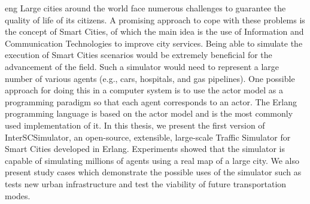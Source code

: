 \begin{resumo}{eng}
Large cities around the world face numerous challenges to guarantee the quality of life of its citizens. A promising approach to cope with these problems is the concept of Smart Cities, of which the main idea is the use of Information and Communication Technologies to improve city services. Being able to simulate the execution of Smart Cities scenarios would be extremely beneficial for the advancement of the field. Such a simulator would need to represent a large number of various agents (e.g., cars, hospitals, and gas pipelines). One possible approach for doing this in a computer system is to use the actor model as a programming paradigm so that each agent corresponds to an actor. The Erlang programming language is based on the actor model and is the most commonly used implementation of it. In this thesis, we present the first version of InterSCSimulator, an open-source, extensible, large-scale Traffic Simulator for Smart Cities developed in Erlang. Experiments showed that the simulator is capable of simulating millions of agents using a real map of a large city. We also present study cases which demonstrate the possible uses of the simulator such as tests new urban infrastructure and test the viability of future transportation modes.
\end{resumo}



